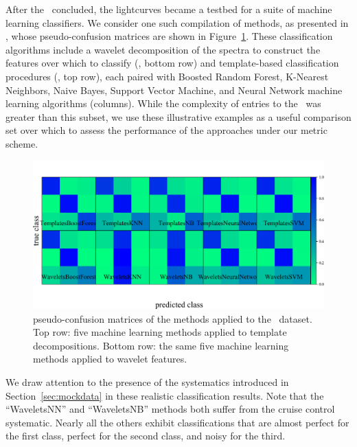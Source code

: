 After the \snphotcc\ concluded, the lightcurves became a testbed for a suite of machine learning classifiers.
We consider one such compilation of methods, as presented in \citet{lochner_photometric_2016}, whose pseudo-confusion matrices are shown in Figure~\ref{fig:snphotcc_cm}.
These classification algorithms include a wavelet decomposition of the spectra to construct the features over which to classify (\citet{2011MNRAS.414.1987N}, bottom row) and template-based classification procedures (\citet{2011ApJ...738..162S}, top row), each paired with Boosted Random Forest, K-Nearest Neighbors, Naive Bayes, Support Vector Machine, and Neural Network machine learning algorithms (columns).
While the complexity of entries to the \snphotcc\ was greater than this subset, we use these illustrative examples as a useful comparison set over which to assess the performance of the approaches under our metric scheme.

\begin{figure}
	\begin{center}
    \includegraphics[width=\textwidth]{./fig/all_snphotcc_cm.png}
		\caption{pseudo-confusion matrices of the \citet{lochner_photometric_2016} methods applied to the \snphotcc\ dataset.
    Top row: five machine learning methods applied to template decompositions.
    Bottom row: the same five machine learning methods applied to wavelet features.}
		\label{fig:snphotcc_cm}
	\end{center}
\end{figure}

We draw attention to the presence of the systematics introduced in Section~\ref{sec:mockdata} in these realistic classification results.
Note that the ``WaveletsNN'' and ``WaveletsNB'' methods both suffer from the cruise control systematic.
Nearly all the others exhibit classifications that are almost perfect for the first class, perfect for the second class, and noisy for the third.

%
